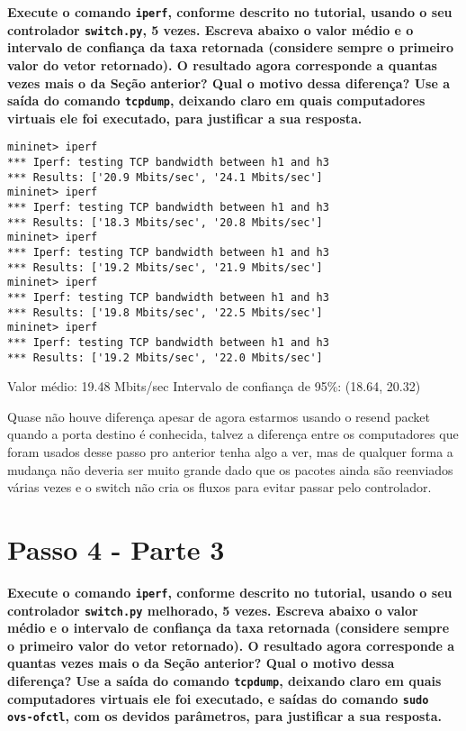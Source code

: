 \documentclass[12pt,letterpaper]{article}
\begin{document}
\textbf{Execute o comando \texttt{iperf}, conforme descrito no
tutorial, usando o seu controlador \texttt{switch.py}, 5 vezes.
Escreva abaixo o valor médio e o intervalo de confiança da taxa
retornada (considere sempre o primeiro valor do vetor retornado). O
resultado agora corresponde a quantas vezes mais o da Seção anterior?
Qual o motivo dessa diferença? Use a saída do comando
\texttt{tcpdump}, deixando claro em quais computadores virtuais ele
foi executado, para justificar a sua resposta.}

\begin{verbatim}
mininet> iperf
*** Iperf: testing TCP bandwidth between h1 and h3
*** Results: ['20.9 Mbits/sec', '24.1 Mbits/sec']
mininet> iperf
*** Iperf: testing TCP bandwidth between h1 and h3
*** Results: ['18.3 Mbits/sec', '20.8 Mbits/sec']
mininet> iperf
*** Iperf: testing TCP bandwidth between h1 and h3
*** Results: ['19.2 Mbits/sec', '21.9 Mbits/sec']
mininet> iperf
*** Iperf: testing TCP bandwidth between h1 and h3
*** Results: ['19.8 Mbits/sec', '22.5 Mbits/sec']
mininet> iperf
*** Iperf: testing TCP bandwidth between h1 and h3
*** Results: ['19.2 Mbits/sec', '22.0 Mbits/sec']
\end{verbatim}

Valor médio: 19.48 Mbits/sec
Intervalo de confiança de 95\%: (18.64, 20.32)

Quase não houve diferença apesar de agora estarmos usando o resend packet quando a porta destino é conhecida,
talvez a diferença entre os computadores que foram usados desse passo pro anterior tenha algo a ver, mas de qualquer forma a mudança não deveria ser muito grande dado que os pacotes ainda são reenviados várias vezes e o switch não cria os fluxos para evitar passar pelo controlador.

\section{Passo 4 - Parte 3}

\textbf{Execute o comando \texttt{iperf}, conforme descrito no
tutorial, usando o seu controlador \texttt{switch.py} melhorado, 5
vezes. Escreva abaixo o valor médio e o intervalo de confiança da taxa
retornada (considere sempre o primeiro valor do vetor retornado). O
resultado agora corresponde a quantas vezes mais o da Seção anterior?
Qual o motivo dessa diferença? Use a saída do comando
\texttt{tcpdump}, deixando claro em quais computadores virtuais ele
foi executado, e saídas do comando \texttt{sudo ovs-ofctl}, com os
devidos parâmetros, para justificar a sua resposta.}
\end{document}
